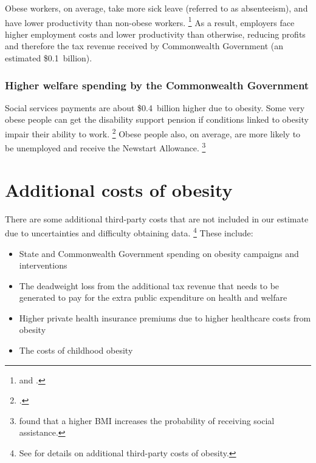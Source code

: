 \documentclass[embargoed]{grattan}
\begin{document}
Obese workers, on average, take more sick leave (referred to as absenteeism), and have lower productivity than non-obese workers.%
\footnote{\textcite{RepresentativesStandingCommitteeonHealth2009Weighingitup} and \textcite{Medibank2011SickWorkcost}.} As a result, employers face higher employment costs and lower productivity than otherwise, reducing profits and therefore the tax revenue received by Commonwealth Government (an estimated \$0.1~billion).

\subsubsection{Higher welfare spending by the Commonwealth Government }\label{higher-welfare-spending-by-the-commonwealth-government}

Social services payments are about \$0.4~billion higher due to obesity.
Some very obese people can get the disability support pension if conditions linked to obesity impair their ability to work.%
\footcite{SocialServices2014FrequentlyAskedQuestions} Obese people also, on average, are more likely to be unemployed and receive the Newstart Allowance.%
\footnote{\textcite{Boeckerman2016EffectWeightLabor} found that a higher BMI increases the probability of receiving social assistance.}

\section{Additional costs of obesity }\label{additional-costs-of-obesity}

There are some additional third-party costs that are not included in our estimate due to uncertainties and difficulty obtaining data.%
\footnote{See  for details on additional third-party costs of obesity.} These include:

\begin{itemize}
\item
  State and Commonwealth Government spending on obesity campaigns and interventions
\item
  The deadweight loss from the additional tax revenue that needs to be generated to pay for the extra public expenditure on health and welfare
\item
  Higher private health insurance premiums due to higher healthcare costs from obesity
\item
  The costs of childhood obesity
\end{itemize}
\end{document}
